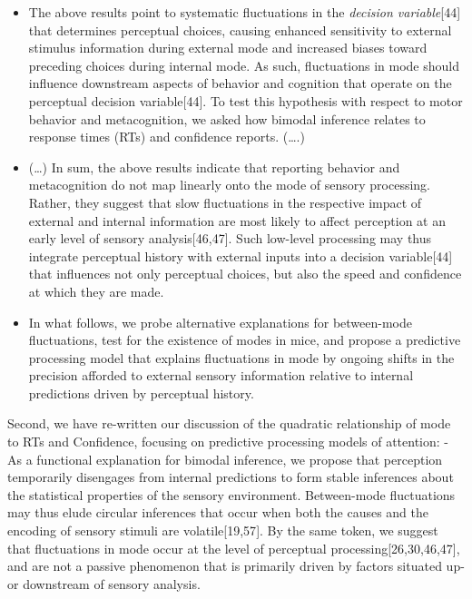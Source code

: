 \documentclass[
]{article}
\begin{document}
\begin{itemize}
\item
  The above results point to systematic fluctuations in the
  \emph{decision variable}{[}44{]} that determines perceptual choices,
  causing enhanced sensitivity to external stimulus information during
  external mode and increased biases toward preceding choices during
  internal mode. As such, fluctuations in mode should influence
  downstream aspects of behavior and cognition that operate on the
  perceptual decision variable{[}44{]}. To test this hypothesis with
  respect to motor behavior and metacognition, we asked how bimodal
  inference relates to response times (RTs) and confidence reports.
  (\ldots.)
\item
  (\ldots) In sum, the above results indicate that reporting behavior
  and metacognition do not map linearly onto the mode of sensory
  processing. Rather, they suggest that slow fluctuations in the
  respective impact of external and internal information are most likely
  to affect perception at an early level of sensory analysis{[}46,47{]}.
  Such low-level processing may thus integrate perceptual history with
  external inputs into a decision variable{[}44{]} that influences not
  only perceptual choices, but also the speed and confidence at which
  they are made.
\item
  In what follows, we probe alternative explanations for between-mode
  fluctuations, test for the existence of modes in mice, and propose a
  predictive processing model that explains fluctuations in mode by
  ongoing shifts in the precision afforded to external sensory
  information relative to internal predictions driven by perceptual
  history.
\end{itemize}

Second, we have re-written our discussion of the quadratic relationship
of mode to RTs and Confidence, focusing on predictive processing models
of attention: - As a functional explanation for bimodal inference, we
propose that perception temporarily disengages from internal predictions
to form stable inferences about the statistical properties of the
sensory environment. Between-mode fluctuations may thus elude circular
inferences that occur when both the causes and the encoding of sensory
stimuli are volatile{[}19,57{]}. By the same token, we suggest that
fluctuations in mode occur at the level of perceptual
processing{[}26,30,46,47{]}, and are not a passive phenomenon that is
primarily driven by factors situated up- or downstream of sensory
analysis.
\end{document}
